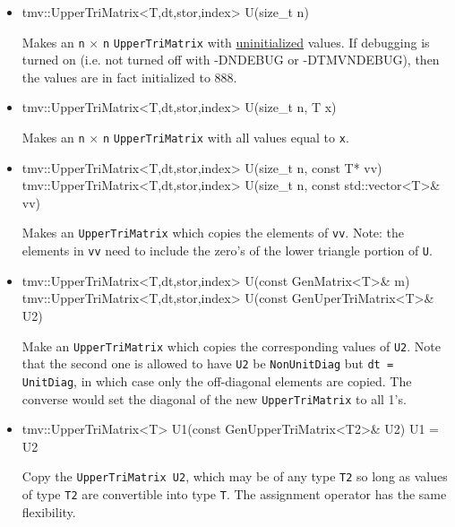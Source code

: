 \documentclass[twoside,letterpaper,11pt]{article}
\renewcommand{\tt}[1]{{\lstinline {#1}}}
\begin{document}
\begin{itemize}
\item 
\begin{tmvcode}
tmv::UpperTriMatrix<T,dt,stor,index> U(size_t n)
\end{tmvcode}
Makes an \tt{n} $\times$ \tt{n} \tt{UpperTriMatrix} with \underline{uninitialized} values.
If debugging is turned on (i.e. not turned off
with -DNDEBUG or -DTMVNDEBUG), then the values are in fact initialized to 888.  

\item
\begin{tmvcode}
tmv::UpperTriMatrix<T,dt,stor,index> U(size_t n, T x)
\end{tmvcode}
Makes an \tt{n} $\times$ \tt{n} \tt{UpperTriMatrix} with all values equal to \tt{x}.

\item
\begin{tmvcode}
tmv::UpperTriMatrix<T,dt,stor,index> U(size_t n, const T* vv)
tmv::UpperTriMatrix<T,dt,stor,index> U(size_t n, 
      const std::vector<T>& vv)
\end{tmvcode}
Makes an \tt{UpperTriMatrix} which copies the elements of \tt{vv}.
Note: the elements in \tt{vv} need to include the zero's of the lower triangle 
portion of \tt{U}.

\item 
\begin{tmvcode}
tmv::UpperTriMatrix<T,dt,stor,index> U(const GenMatrix<T>& m)
tmv::UpperTriMatrix<T,dt,stor,index> U(const GenUperTriMatrix<T>& U2)
\end{tmvcode}
Make an \tt{UpperTriMatrix} which copies the corresponding values of
\tt{U2}.  Note that the second one is allowed to have \tt{U2} be
\tt{NonUnitDiag} but \tt{dt = UnitDiag}, in which case only the 
off-diagonal elements are copied.  The converse would set the 
diagonal of the new \tt{UpperTriMatrix} to all 1's.

\item
\begin{tmvcode}
tmv::UpperTriMatrix<T> U1(const GenUpperTriMatrix<T2>& U2)
U1 = U2
\end{tmvcode}
Copy the \tt{UpperTriMatrix U2}, which may be of any type \tt{T2} so long
as values of type \tt{T2} are convertible into type \tt{T}.
The assignment operator has the same flexibility.


\end{itemize}
\end{document}
